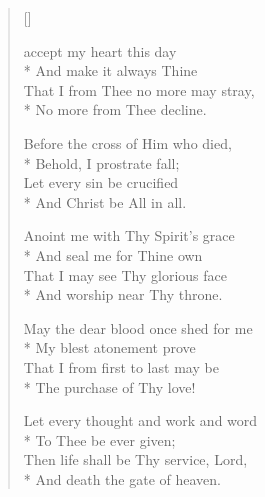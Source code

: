 \newHymn
{}

%

\begin{verse}[\versewidth]

\begin{altverse}
 accept my heart this day\\*
        And make it always Thine\\
        That I from Thee no more may stray,\\*
        No more from Thee decline.
\end{altverse}

\begin{altverse}
 Before the cross of Him who died,\\*
        Behold, I prostrate fall;\\
        Let every sin be crucified\\*
        And Christ be All in all.
\end{altverse}

\begin{altverse}
 Anoint me with Thy Spirit's grace\\*
        And seal me for Thine own\\
        That I may see Thy glorious face\\*
        And worship near Thy throne.
\end{altverse}

\begin{altverse}
 May the dear blood once shed for me\\*
        My blest atonement prove\\
        That I from first to last may be\\*
        The purchase of Thy love!
\end{altverse}

\begin{altverse}
 Let every thought and work and word\\*
        To Thee be ever given;\\
        Then life shall be Thy service, Lord,\\*
        And death the gate of heaven.
\end{altverse}

\end{verse}


